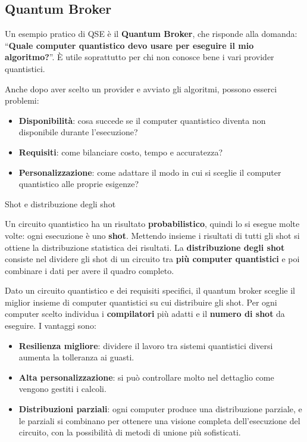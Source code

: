 \subsection{Quantum Broker}\label{quantum-broker}

Un esempio pratico di QSE è il \textbf{Quantum Broker}, che risponde
alla domanda: ``\textbf{Quale computer quantistico devo usare per
eseguire il mio algoritmo?}''. È utile soprattutto per chi non conosce
bene i vari provider quantistici.

Anche dopo aver scelto un provider e avviato gli algoritmi, possono
esserci problemi:

\begin{itemize}
\tightlist
\item
  \textbf{Disponibilità}: cosa succede se il computer quantistico
  diventa non disponibile durante l'esecuzione?
\item
  \textbf{Requisiti}: come bilanciare costo, tempo e accuratezza?
\item
  \textbf{Personalizzazione}: come adattare il modo in cui si sceglie il
  computer quantistico alle proprie esigenze?
\end{itemize}

\begin{boxdefinition}{Shot e distribuzione degli shot}

Un circuito quantistico ha un risultato \textbf{probabilistico}, quindi
lo si esegue molte volte: ogni esecuzione è uno \textbf{shot}. Mettendo
insieme i risultati di tutti gli shot si ottiene la distribuzione
statistica dei risultati. La \textbf{distribuzione degli shot} consiste
nel dividere gli shot di un circuito tra \textbf{più computer
quantistici} e poi combinare i dati per avere il quadro completo.

\end{boxdefinition}

Dato un circuito quantistico e dei requisiti specifici, il quantum
broker sceglie il miglior insieme di computer quantistici su cui
distribuire gli shot. Per ogni computer scelto individua i
\textbf{compilatori} più adatti e il \textbf{numero di shot} da
eseguire. I vantaggi sono:

\begin{itemize}
\tightlist
\item
  \textbf{Resilienza migliore}: dividere il lavoro tra sistemi
  quantistici diversi aumenta la tolleranza ai guasti.
\item
  \textbf{Alta personalizzazione}: si può controllare molto nel
  dettaglio come vengono gestiti i calcoli.
\item
  \textbf{Distribuzioni parziali}: ogni computer produce una
  distribuzione parziale, e le parziali si combinano per ottenere una
  visione completa dell'esecuzione del circuito, con la possibilità di
  metodi di unione più sofisticati.
\end{itemize}
